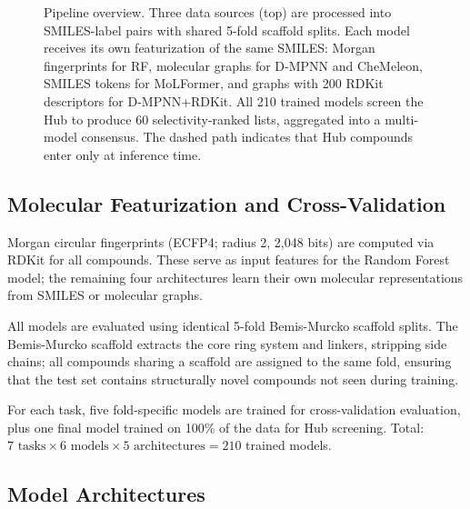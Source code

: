 \documentclass{article}
\begin{document}
\begin{figure}[t]
\caption{Pipeline overview. Three data sources (top) are processed into SMILES-label pairs with shared 5-fold scaffold splits. Each model receives its own featurization of the same SMILES: Morgan fingerprints for RF, molecular graphs for D-MPNN and CheMeleon, SMILES tokens for MoLFormer, and graphs with 200 RDKit descriptors for D-MPNN+RDKit. All 210 trained models screen the Hub to produce 60 selectivity-ranked lists, aggregated into a multi-model consensus. The dashed path indicates that Hub compounds enter only at inference time.}
\label{fig:pipeline}
\end{figure}

\subsection{Molecular Featurization and Cross-Validation}
\label{sec:features}

Morgan circular fingerprints (ECFP4; radius 2, 2,048 bits) are computed via RDKit for all compounds.
These serve as input features for the Random Forest model; the remaining four architectures learn their own molecular representations from SMILES or molecular graphs.

All models are evaluated using identical 5-fold Bemis-Murcko scaffold splits.
The Bemis-Murcko scaffold extracts the core ring system and linkers, stripping side chains; all compounds sharing a scaffold are assigned to the same fold, ensuring that the test set contains structurally novel compounds not seen during training.

For each task, five fold-specific models are trained for cross-validation evaluation, plus one final model trained on 100\% of the data for Hub screening.
Total: $7 \text{ tasks} \times 6 \text{ models} \times 5 \text{ architectures} = 210$ trained models.

\subsection{Model Architectures}
\label{sec:models}
\end{document}
